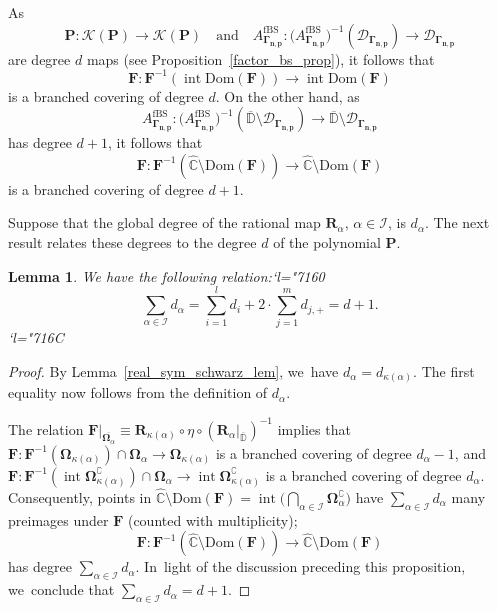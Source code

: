 \documentclass[JEP,XML,SOM,Unicode,NoFloatCountersInSection,published]{cedram}
\newcommand{\Changel}{\mathcode`l="7160}
\newcommand{\Changelback}{\mathcode`l="716C}
\newtheorem{lemma}{Lemma}[section]
\theoremstyle{definition}
\theoremstyle{remark}
\newcommand{\C}{\mathbb{C}}
\newcommand{\D}{\mathbb{D}}
\DeclareMathOperator{\Int}{int}
\begin{document}
As\vspace*{-3pt}
\[
\pmb{P}:\mathcal{K}(\pmb{P})\to\mathcal{K}(\pmb{P})\quad \text{and}\quad A_{\pmb{\Gamma_{n,p}}}^{\mathrm{fBS}}: \bigl(A_{\pmb{\Gamma_{n,p}}}^{\mathrm{fBS}}\bigr)^{-1}(\mathcal{D}_{\pmb{\Gamma_{n,p}}})\to \mathcal{D}_{\pmb{\Gamma_{n,p}}}
\]
are degree $d$ maps (see Proposition~\ref{factor_bs_prop}), it follows that\vspace*{-3pt}
\[
\pmb{F}:\pmb{F}^{-1}(\Int{\mathrm{Dom}(\pmb{F})})\to \Int{\mathrm{Dom}(\pmb{F})}
\]
is a branched covering of degree $d$. On the other hand, as\vspace*{-3pt}
\[
A_{\pmb{\Gamma_{n,p}}}^{\mathrm{fBS}}: \bigl(A_{\pmb{\Gamma_{n,p}}}^{\mathrm{fBS}}\bigr)^{-1}(\overline{\D}\setminus\mathcal{D}_{\pmb{\Gamma_{n,p}}})\to \overline{\D}\setminus\mathcal{D}_{\pmb{\Gamma_{n,p}}}
\]
has degree $d+1$, it follows that\vspace*{-3pt}
\[
\pmb{F}:\pmb{F}^{-1}(\widehat{\C}\setminus\mathrm{Dom}(\pmb{F}))\to \widehat{\C}\setminus\mathrm{Dom}(\pmb{F})
\]
is a branched covering of degree $d+1$.

Suppose that the global degree of the rational map $\pmb{R}_\alpha$, $\alpha\in\mathcal{I}$, is $d_\alpha$. The next result relates these degrees to the degree $d$ of the polynomial $\pmb{P}$.
\begin{lemma}\label{deg_formula_lem}
We have the following relation:\vspace*{-3pt}\Changel
\begin{equation}
\sum_{\alpha\in\mathcal{I}} d_\alpha=\sum_{i=1}^l d_i + 2\cdot \sum_{j=1}^m d_{j,+} = d+1.
\label{degree_formula}
\end{equation}\Changelback
\end{lemma}
\begin{proof}
By Lemma~\ref{real_sym_schwarz_lem}, we~have $d_{\alpha}=d_{\kappa(\alpha)}$. The first equality now follows from the definition of $d_\alpha$.

The relation $\pmb{F}\vert_{\overline{\pmb{\Omega}_\alpha}}\equiv \pmb{R}_{\kappa(\alpha)}\circ\eta\circ(\pmb{R}_\alpha\vert_{\overline{\D}})^{-1}$ implies that $\pmb{F}:\pmb{F}^{-1}(\pmb{\Omega}_{\kappa(\alpha)})\cap\pmb{\Omega}_\alpha\to \pmb{\Omega}_{\kappa(\alpha)}$ is a branched covering of degree $d_\alpha-1$, and
$\pmb{F}:\pmb{F}^{-1}(\Int{\pmb{\Omega}_{\kappa(\alpha)}^\complement})\cap\pmb{\Omega}_\alpha\to \Int{\pmb{\Omega}_{\kappa(\alpha)}^\complement}$ is a branched covering of degree $d_\alpha$. Consequently, points in $\widehat{\C}\setminus\mathrm{Dom}(\pmb{F})=\Int{\bigl(\bigcap_{\alpha\in\mathcal{I}} \pmb{\Omega}_\alpha^\complement\bigr)}$ have $\sum_{\alpha\in\mathcal{I}} d_\alpha$ many preimages under $\pmb{F}$ (counted with multiplicity); \ie\vspace*{-3pt}
\[
\pmb{F}:\pmb{F}^{-1}(\widehat{\C}\setminus\mathrm{Dom}(\pmb{F}))\to \widehat{\C}\setminus\mathrm{Dom}(\pmb{F})
\]
has degree $\sum_{\alpha\in\mathcal{I}} d_\alpha$. In~light of the discussion preceding this proposition, we~conclude that $\sum_{\alpha\in\mathcal{I}} d_\alpha=d+1.$
\end{proof}
\end{document}
